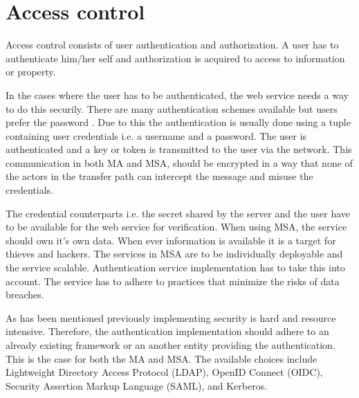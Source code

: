 \section{Access control}
\begin{sloppypar}
    Access control consists of user authentication and authorization. A user has
    to authenticate him/her self and authorization is acquired to access to
    information or property.
\end{sloppypar}
\begin{sloppypar}
    In the cases where the user has to be authenticated, the web service needs a
    way to do this securily. There are many authentication schemes available but
    users prefer the password \citep{passwordisdead}. Due to this the
    authentication is usually done using a tuple containing user credentials
    i.e. a username and a password. The user is authenticated and a key or token
    is transmitted to the user via the network. This communication in both MA
    and MSA, should be encrypted in a way that none of the actors in the
    transfer path can intercept the message and misuse the credentials. 
\end{sloppypar}
\begin{sloppypar}
    The credential counterparts i.e. the secret shared by the server and the
    user have to be available for the web service for verification. When using
    MSA, the service should own it's own data. When ever information is
    available it is a target for thieves and hackers. The services in MSA are to
    be individually deployable and the service scalable. Authentication service
    implementation has to take this into account. The service has to adhere to
    practices that minimize the risks of data breaches. 
\end{sloppypar}
\begin{sloppypar}
    As has been mentioned previously implementing security is hard and resource
    intensive. Therefore, the authentication implementation should adhere to an
    already existing framework or an another entity providing the
    authentication. This is the case for both the MA and MSA. The available
    choices include Lightweight Directory Access Protocol (LDAP), OpenID Connect
    (OIDC), Security Assertion Markup Language (SAML), and Kerberos.
\end{sloppypar}

